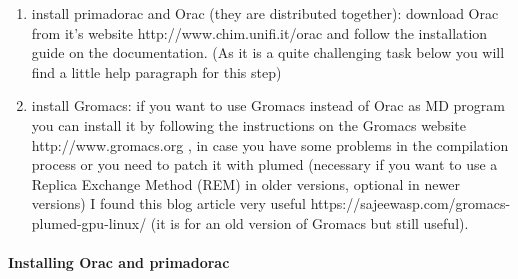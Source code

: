 \begin{enumerate}
		\item install primadorac\cite{primadorac} and Orac\cite{orac} (they are distributed together): download Orac from it's website http://www.chim.unifi.it/orac and follow the installation guide on the documentation. (As it is a quite challenging task below you will find a little help paragraph for this step)
		
		\item install Gromacs\cite{gromacs_ABRAHAM201519}: if you want to use Gromacs instead of Orac as MD program you can install it by following the instructions on the Gromacs website http://www.gromacs.org , in case you have some problems in the compilation process or you need to patch it with plumed (necessary if you want to use a Replica Exchange Method (REM) in older versions, optional in newer versions) I found this blog article very useful https://sajeewasp.com/gromacs-plumed-gpu-linux/ (it is for an old version of Gromacs but still useful).
	\end{enumerate}

	\paragraph{Installing Orac and primadorac}
	
